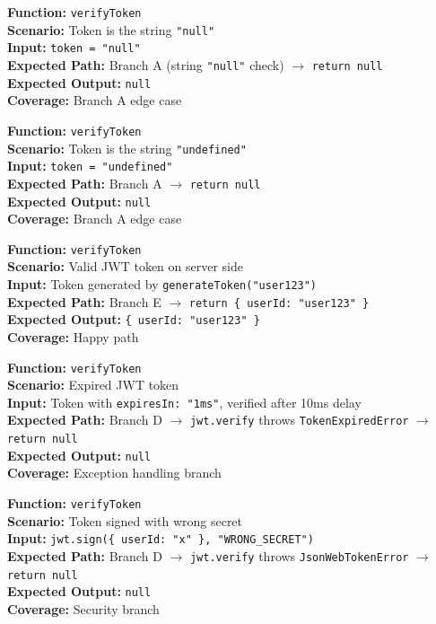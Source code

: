 \documentclass[12pt,onecolumn]{IEEEtran}
\begin{document}
\textbf{Function:} \texttt{verifyToken} \\
\textbf{Scenario:} Token is the string \texttt{"null"} \\
\textbf{Input:} \texttt{token = "null"} \\
\textbf{Expected Path:} Branch A (string \texttt{"null"} check) $\to$ \texttt{return null} \\
\textbf{Expected Output:} \texttt{null} \\
\textbf{Coverage:} Branch A edge case



\textbf{Function:} \texttt{verifyToken} \\
\textbf{Scenario:} Token is the string \texttt{"undefined"} \\
\textbf{Input:} \texttt{token = "undefined"} \\
\textbf{Expected Path:} Branch A $\to$ \texttt{return null} \\
\textbf{Expected Output:} \texttt{null} \\
\textbf{Coverage:} Branch A edge case



\textbf{Function:} \texttt{verifyToken} \\
\textbf{Scenario:} Valid JWT token on server side \\
\textbf{Input:} Token generated by \texttt{generateToken("user123")} \\
\textbf{Expected Path:} Branch E $\to$ \texttt{return \{ userId: "user123" \}} \\
\textbf{Expected Output:} \texttt{\{ userId: "user123" \}} \\
\textbf{Coverage:} Happy path



\textbf{Function:} \texttt{verifyToken} \\
\textbf{Scenario:} Expired JWT token \\
\textbf{Input:} Token with \texttt{expiresIn: "1ms"}, verified after 10ms delay \\
\textbf{Expected Path:} Branch D $\to$ \texttt{jwt.verify} throws \texttt{TokenExpiredError} $\to$ \texttt{return null} \\
\textbf{Expected Output:} \texttt{null} \\
\textbf{Coverage:} Exception handling branch



\textbf{Function:} \texttt{verifyToken} \\
\textbf{Scenario:} Token signed with wrong secret \\
\textbf{Input:} \texttt{jwt.sign(\{ userId: "x" \}, "WRONG\_SECRET")} \\
\textbf{Expected Path:} Branch D $\to$ \texttt{jwt.verify} throws \texttt{JsonWebTokenError} $\to$ \texttt{return null} \\
\textbf{Expected Output:} \texttt{null} \\
\textbf{Coverage:} Security branch
\end{document}
